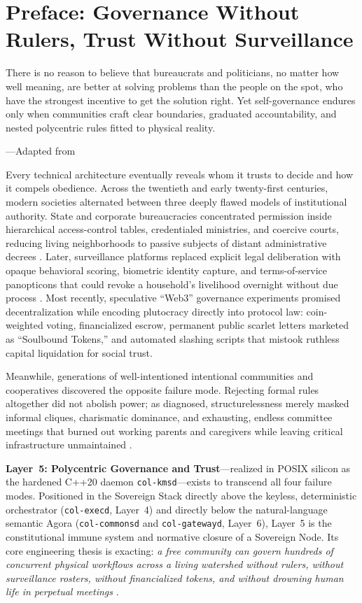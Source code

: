 \chapter*{Preface: Governance Without Rulers, Trust Without Surveillance}

\epigraph{There is no reason to believe that bureaucrats and politicians, no matter how well meaning, are better at solving problems than the people on the spot, who have the strongest incentive to get the solution right. Yet self-governance endures only when communities craft clear boundaries, graduated accountability, and nested polycentric rules fitted to physical reality.}{---Adapted from \textcite{ostrom1990,ostrom2010}}

Every technical architecture eventually reveals whom it trusts to decide and how it compels
obedience. Across the twentieth and early twenty-first centuries, modern societies alternated
between three deeply flawed models of institutional authority. State and corporate
bureaucracies concentrated permission inside hierarchical access-control tables, credentialed
ministries, and coercive courts, reducing living neighborhoods to passive subjects of distant
administrative decrees \parencite{scott1998,hart1961}. Later, surveillance platforms replaced
explicit legal deliberation with opaque behavioral scoring, biometric identity capture, and
terms-of-service panopticons that could revoke a household's livelihood overnight without due
process \parencite{zuboff2019}. Most recently, speculative ``Web3'' governance experiments
promised decentralization while encoding plutocracy directly into protocol law: coin-weighted
voting, financialized escrow, permanent public scarlet letters marketed as ``Soulbound
Tokens,'' and automated slashing scripts that mistook ruthless capital liquidation for social
trust.

Meanwhile, generations of well-intentioned intentional communities and cooperatives discovered
the opposite failure mode. Rejecting formal rules altogether did not abolish power; as
\textcite{freeman1972} diagnosed, structurelessness merely masked informal cliques, charismatic
dominance, and exhausting, endless committee meetings that burned out working parents and
caregivers while leaving critical infrastructure unmaintained \parencite{michels1911,han2015}.

\textbf{Layer~5: Polycentric Governance and Trust}---realized in POSIX silicon as the hardened
C++20 daemon \texttt{col-kmsd}---exists to transcend all four failure modes. Positioned in the
Sovereign Stack directly above the keyless, deterministic orchestrator (\texttt{col-execd},
Layer~4) and directly below the natural-language semantic Agora (\texttt{col-commonsd} and
\texttt{col-gatewayd}, Layer~6), Layer~5 is the constitutional immune system and normative
closure of a Sovereign Node. Its core engineering thesis is exacting: \textit{a free community
can govern hundreds of concurrent physical workflows across a living watershed without rulers,
without surveillance rosters, without financialized tokens, and without drowning human life in
perpetual meetings} \parencite{beer1974,illich1973,weiser1996calm}.

